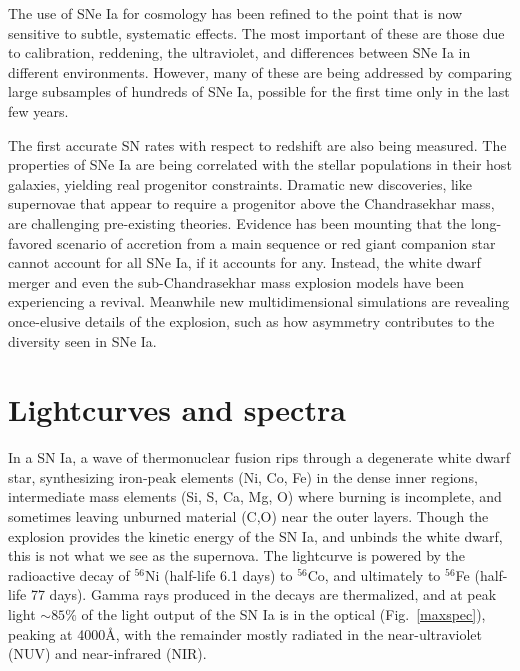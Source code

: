 \documentclass{nature1}
\begin{document}
The use of SNe Ia for cosmology has been refined to the point that is
now sensitive to subtle, systematic effects.  The most important of
these are those due to calibration, reddening, the ultraviolet, and
differences between SNe Ia in different environments.  However, many
of these are being addressed by comparing large subsamples of hundreds
of SNe Ia, possible for the first time only in the last few years.

The first accurate SN rates with respect to redshift are also being
measured.  The properties of SNe Ia are being correlated with the
stellar populations in their host galaxies, yielding real progenitor
constraints.  Dramatic new discoveries, like supernovae that appear to
require a progenitor above the Chandrasekhar mass, are challenging
pre-existing theories.  Evidence has been mounting that the
long-favored scenario of accretion from a main sequence or red giant
companion star cannot account for all SNe Ia, if it accounts for
any.  Instead, the white dwarf merger and even the sub-Chandrasekhar
mass explosion models have been experiencing a revival.  Meanwhile new
multidimensional simulations are revealing once-elusive details of the
explosion, such as how asymmetry contributes to the diversity seen in
SNe Ia.

\section{Lightcurves and spectra}
In a SN Ia, a wave of thermonuclear fusion rips through a degenerate
white dwarf star, synthesizing iron-peak elements (Ni, Co, Fe) in the
dense inner regions, intermediate mass elements (Si, S, Ca, Mg, O)
where burning is incomplete, and sometimes leaving unburned material
(C,O) near the outer layers\citep{2000ARA&A..38..191H}.  Though the
explosion provides the kinetic energy of the SN Ia, and unbinds the
white dwarf, this is not what we see as the supernova.  The lightcurve
is powered by the radioactive decay of $^{56}$Ni (half-life 6.1 days)
to $^{56}$Co, and ultimately to $^{56}$Fe (half-life 77
days)\citep{1967CaJPh..45.2315T, 1969ApJ...157..623C}.  Gamma rays
produced in the decays are thermalized, and at peak light $\sim 85\%$
of the light output of the SN Ia is in the optical
(Fig.~\ref{maxspec}), peaking at 4000\AA , with the remainder mostly
radiated in the near-ultraviolet (NUV) and near-infrared
(NIR)\citep{2009ApJ...691..661H}.
\end{document}
